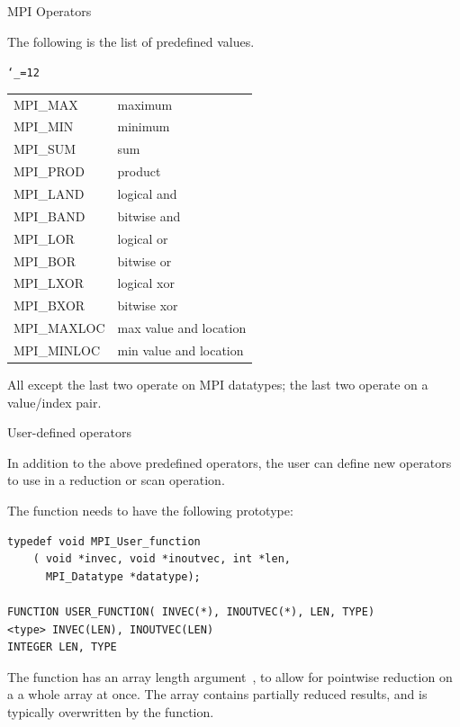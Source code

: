 
 {MPI Operators}

The following is the list of predefined  values.

\begingroup \tt\catcode`\_=12\relax
\begin{tabular}{ll}
  MPI_MAX&maximum\\
  MPI_MIN&minimum\\
  MPI_SUM&sum\\
  MPI_PROD&product\\
  MPI_LAND&logical and\\
  MPI_BAND&bitwise and\\
  MPI_LOR&logical or\\
  MPI_BOR&bitwise or\\
  MPI_LXOR&logical xor\\
  MPI_BXOR&bitwise xor\\
  MPI_MAXLOC&max value and location\\
  MPI_MINLOC&min value and location\\
\end{tabular}
\endgroup
All except the last two operate on MPI datatypes;
the last two operate on a value/index pair.

 {User-defined operators}

In addition to the above predefined operators, the user can define new
operators to use in a reduction or scan operation.


The function needs to have the following prototype:

\begin{verbatim}
typedef void MPI_User_function
    ( void *invec, void *inoutvec, int *len, 
      MPI_Datatype *datatype); 

FUNCTION USER_FUNCTION( INVEC(*), INOUTVEC(*), LEN, TYPE) 
<type> INVEC(LEN), INOUTVEC(LEN) 
INTEGER LEN, TYPE 
\end{verbatim}

The function has an array length argument~, to allow for
pointwise reduction on a a whole array at once. The  array
contains partially reduced results, and is typically overwritten by
the function.


